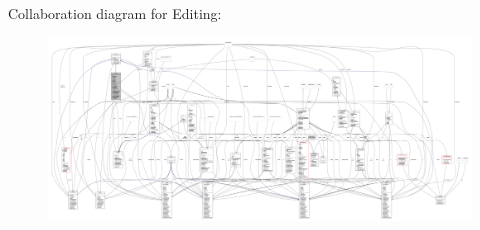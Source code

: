 Collaboration diagram for Editing\+:
\nopagebreak
\begin{figure}[H]
\begin{center}
\leavevmode
\includegraphics[width=350pt]{classscenes_1_1_editing__coll__graph}
\end{center}
\end{figure}
